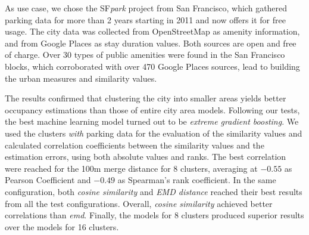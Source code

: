 As use case, we chose the SF\textit{park} project from San Francisco, which gathered parking data for more than 2 years starting in 2011 and now offers it for free usage.
The city data was collected from OpenStreetMap as amenity information, and from Google Places as stay duration values.
Both sources are open and free of charge.
Over 30 types of public amenities were found in the San Francisco blocks, which corroborated with over 470 Google Places sources, lead to building the urban measures and similarity values. 

The results confirmed that clustering the city into smaller areas yields better occupancy estimations than those of entire city area models.
Following our tests, the best machine learning model turned out to be \textit{extreme gradient boosting}.
We used the clusters \textit{with} parking data for the evaluation of the similarity values and calculated correlation coefficients between the similarity values and the estimation errors, using both absolute values and ranks.
The best correlation were reached for the 100m merge distance for 8 clusters, averaging at $-0.55$ as Pearson Coefficient and $-0.49$ as Spearman's rank coefficient.
In the same configuration, both \textit{cosine similarity} and \textit{EMD distance} reached their best results from all the test configurations.
Overall, \textit{cosine similarity} achieved better correlations than \textit{emd}.
Finally, the models for 8 clusters produced superior results over the models for 16 clusters. 


%


